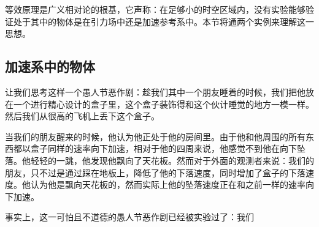 
等效原理是广义相对论的根基，它声称：在足够小的时空区域内，没有实验能够验证处于其中的物体是在引力场中还是加速参考系中。本节将通两个实例来理解这一思想。

\subsection{加速系中的物体}
让我们思考这样一个愚人节恶作剧：趁我们其中一个朋友睡着的时候，我们把他放在一个进行精心设计的盒子里，这个盒子装饰得和这个伙计睡觉的地方一模一样。然后我们从很高的飞机上丢下这个盒子。

当我们的朋友醒来的时候，他认为他正处于他的房间里。由于他和他周围的所有东西都以盒子同样的速率向下加速，相对于他的四周来说，他感觉不到他在向下坠落。他轻轻的一跳，他发现他飘向了天花板。然而对于外面的观测者来说：我们的朋友，只不过是通过踩在地板上，降低了他的下落速度，同时增加了盒子的下落速度。他认为他是飘向天花板的，然而实际上他的坠落速度正在和之前一样的速率向下加速。

事实上，这一可怕且不道德的愚人节恶作剧已经被实验过了：我们
